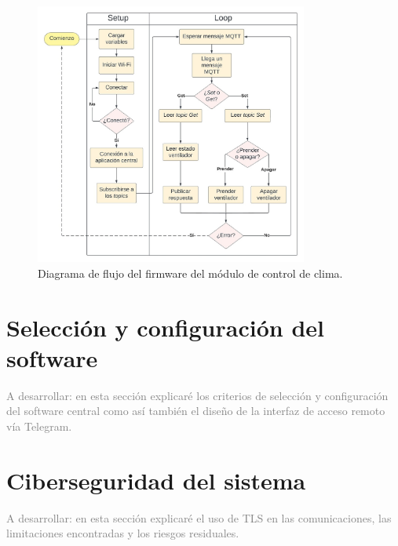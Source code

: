 \begin{figure}[!h]
	\centering
	\includegraphics[width=0.8\textwidth]{./Figures/chapter3/FirmwareVentControl.jpg}
	\caption[Diagrama de flujo del firmware del módulo de control de clima]{Diagrama de flujo del firmware del módulo de control de clima.}
	\label{fig:flow_climacontrol}
\end{figure}










\pagebreak
\section{Selección y configuración del software}
\label{sec:Selección y configuración del software}

\textcolor{gray}{A desarrollar: en esta sección explicaré los criterios de selección y configuración del software central como así también el diseño de la interfaz de acceso remoto vía Telegram. }

\section{Ciberseguridad del sistema}
\label{sec:Ciberseguridad del sistema}
\textcolor{gray}{A desarrollar: en esta sección explicaré el uso de TLS en las comunicaciones, las limitaciones encontradas y los riesgos residuales. }

